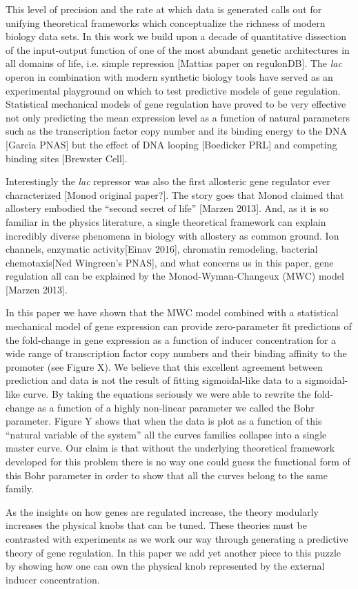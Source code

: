 This level of precision and the rate at which data is generated calls out for
unifying theoretical frameworks which conceptualize the richness of modern
biology data sets. In this work we build upon a decade of quantitative
dissection of the input-output function of one of the most abundant genetic
architectures in all domains of life, i.e. simple repression [Mattias paper on
regulonDB]. The \textit{lac} operon in combination with modern synthetic biology
tools have served as an experimental playground on which to test predictive
models of gene regulation. Statistical mechanical models of gene regulation have
proved to be very effective not only predicting the mean expression level as a
function of natural parameters such as the transcription factor copy number and
its binding energy to the DNA [Garcia PNAS] but the effect of DNA looping
[Boedicker PRL] and competing binding sites [Brewster Cell].

Interestingly the \textit{lac} repressor was also the first allosteric gene
regulator ever characterized [Monod original paper?]. The story goes that Monod
claimed that allostery embodied the ``second secret of life'' [Marzen 2013].
And, as it is so familiar in the physics literature, a single theoretical
framework can explain incredibly diverse phenomena in biology with allostery as
common ground. Ion channels, enzymatic activity[Einav 2016], chromatin
remodeling, bacterial chemotaxis[Ned Wingreen's PNAS], and what concerns us in
this paper, gene regulation all can be explained by the Monod-Wyman-Changeux
(MWC) model [Marzen 2013]. 

In this paper we have shown that the MWC model combined with a statistical
mechanical model of gene expression can provide zero-parameter fit predictions
of the fold-change in gene expression as a function of inducer concentration for
a wide range of transcription factor copy numbers and their binding affinity to
the promoter (see Figure X). We believe that this excellent agreement between
prediction and data is not the result of fitting sigmoidal-like data to a
sigmoidal-like curve. By taking the equations seriously we were able to rewrite
the fold-change as a function of a highly non-linear parameter we called the
Bohr parameter. Figure Y shows that when the data is plot as a function of this
``natural variable of the system'' all the curves families collapse into a
single master curve. Our claim is that without the underlying theoretical
framework developed for this problem there is no way one could guess the
functional form of this Bohr parameter in order to show that all the curves
belong to the same family.

As the insights on how genes are regulated increase, the theory modularly
increases the physical knobs that can be tuned. These theories must be
contrasted with experiments as we work our way through generating a predictive
theory of gene regulation. In this paper we add yet another piece to this puzzle
by showing how one can own the physical knob represented by the external inducer
concentration.

